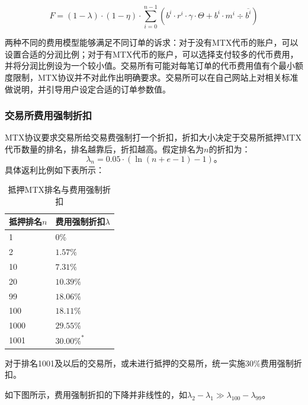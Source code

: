 \documentclass[UTF8,nofonts]{ctexart}
\begin{document}
\begin{equation*}
F =(1-\lambda)\cdot (1-\eta) \cdot  \sum^{n-1}_{i=0} (b^i \cdot r^i \cdot \gamma \cdot \Theta + b^i \cdot m^i  \div \overline{b^i})
\end{equation*}


两种不同的费用模型能够满足不同订单的诉求：对于没有MTX代币的账户，可以设置合适的分润比例；对于有MTX代币的账户，可以选择支付较多的代币费用，并将分润比例设为一个较小值。交易所有可能对每笔订单的代币费用值有个最小额度限制，MTX协议并不对此作出明确要求。交易所可以在自己网站上对相关标准做说明，并引导用户设定合适的订单参数值。

\subsubsection{交易所费用强制折扣}
MTX协议要求交易所给交易费强制打一个折扣，折扣大小决定于交易所抵押MTX代币数量的排名，排名越靠后，折扣越高。假定排名为$n$的折扣为：
$$\lambda_{n} = 0.05\cdot(\ln (n+e-1) - 1)\text{。}$$
具体返利比例如下表所示：


\begin{table}[hbt]
  \centering
\begin{tabular}{p{3.5cm}|p{3cm}} %
抵押排名$n$ & 费用强制折扣$\lambda$ \\ %
    \hline
1 & 0\%\\
\hline
2 & $1.57\%$\\
\hline
10 & $7.31\%$\\
\hline
20 & $10.39\%$\\
\hline
99 &$18.06\%$\\
\hline
100 &$18.11\%$\\
\hline
1000 &$29.55\%$\\
\hline
1001 &$30.00\%^*$\\
  \end{tabular}
\caption{抵押MTX排名与费用强制折扣} %
\end{table}


对于排名1001及以后的交易所，或未进行抵押的交易所，统一实施30\%费用强制折扣。

如下图所示，费用强制折扣的下降并非线性的，如$\lambda_{2} - \lambda_{1} \gg \lambda_{100} - \lambda_{99}$。
\end{document}
